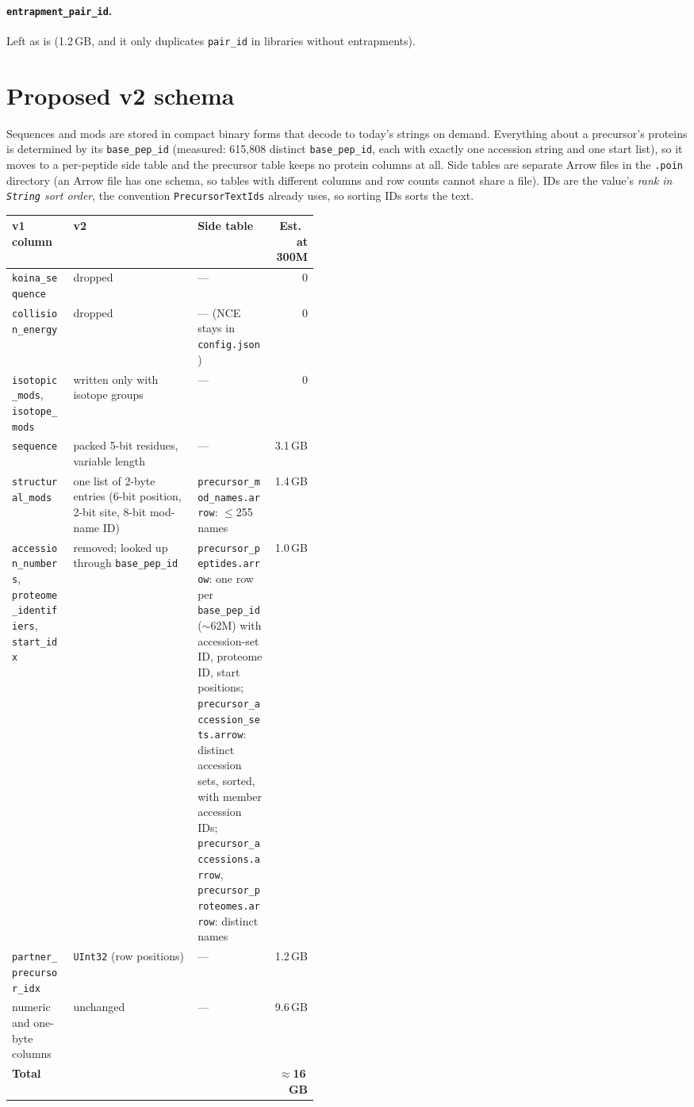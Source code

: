 \documentclass[10pt]{article}
\newcommand{\code}[1]{\texttt{#1}}
\begin{document}
\paragraph{\code{entrapment\_pair\_id}.} Left as is (1.2\,GB, and it only duplicates \code{pair\_id} in
libraries without entrapments).

\section{Proposed v2 schema}
Sequences and mods are stored in compact binary forms that decode to today's strings on demand. Everything about a
precursor's proteins is determined by its \code{base\_pep\_id} (measured: 615,808 distinct \code{base\_pep\_id},
each with exactly one accession string and one start list), so it moves to a per-peptide side table and the precursor
table keeps no protein columns at all. Side tables are separate Arrow files in the \code{.poin} directory (an Arrow file
has one schema, so tables with different columns and row counts cannot share a file). IDs are the value's \emph{rank in
\code{String} sort order}, the convention \code{PrecursorTextIds} already uses, so sorting IDs sorts the text.

\begin{center}\small
\begin{tabularx}{\linewidth}{>{\raggedright\arraybackslash}p{0.2\linewidth} >{\raggedright\arraybackslash}X >{\raggedright\arraybackslash}p{0.25\linewidth} r}
\toprule
v1 column & v2 & Side table & Est.\ at 300M \\
\midrule
\code{koina\_sequence} & dropped & --- & 0 \\
\code{collision\_energy} & dropped & --- (NCE stays in \code{config.json}) & 0 \\
\code{isotopic\_mods}, \code{isotope\_mods} & written only with isotope groups & --- & 0 \\
\code{sequence} & packed 5-bit residues, variable length & --- & 3.1\,GB \\
\code{structural\_mods} & one list of 2-byte entries (6-bit position, 2-bit site, 8-bit mod-name ID) &
  \code{precursor\_mod\_names.arrow}: $\le$255 names & 1.4\,GB \\
\code{accession\_numbers}, \code{proteome\_identifiers}, \code{start\_idx} & removed; looked up through
  \code{base\_pep\_id} & \code{precursor\_peptides.arrow}: one row per \code{base\_pep\_id} ($\sim$62M) with
  accession-set ID, proteome ID, start positions; \code{precursor\_accession\_sets.arrow}: distinct accession sets,
  sorted, with member accession IDs; \code{precursor\_accessions.arrow}, \code{precursor\_proteomes.arrow}:
  distinct names & 1.0\,GB \\
\code{partner\_precursor\_idx} & \code{UInt32} (row positions) & --- & 1.2\,GB \\
numeric and one-byte columns & unchanged & --- & 9.6\,GB \\
\midrule
\textbf{Total} & & & \textbf{$\approx$16\,GB} \\
\bottomrule
\end{tabularx}
\end{center}
\end{document}
